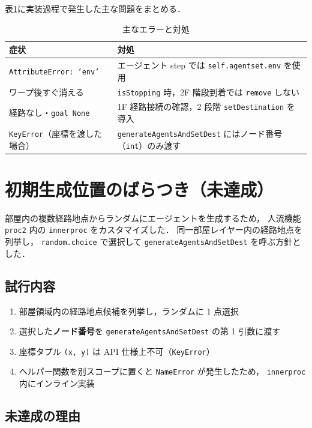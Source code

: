 \documentclass[11pt,a4paper]{ltjsarticle}
\begin{document}
表\ref{tab:errors}に実装過程で発生した主な問題をまとめる．

\begin{table}[H]
  \centering
  \caption{主なエラーと対処}
  \label{tab:errors}
  \small
  \begin{tabular}{p{4.2cm}p{8.5cm}}
    \toprule
    症状 & 対処 \\
    \midrule
    \texttt{AttributeError: 'env'} &
      エージェント step では \texttt{self.agentset.env} を使用 \\
    ワープ後すぐ消える &
      \texttt{isStopping} 時，2F 階段到着では \texttt{remove} しない \\
    経路なし・\texttt{goal None} &
      1F 経路接続の確認，2 段階 \texttt{setDestination} を導入 \\
    \texttt{KeyError}（座標を渡した場合） &
      \texttt{generateAgentsAndSetDest} にはノード番号（\texttt{int}）のみ渡す \\
    \bottomrule
  \end{tabular}
\end{table}

\section{初期生成位置のばらつき（未達成）}

部屋内の複数経路地点からランダムにエージェントを生成するため，
人流機能 \texttt{proc2} 内の \texttt{innerproc} をカスタマイズした．
同一部屋レイヤー内の経路地点を列挙し，
\texttt{random.choice} で選択して \texttt{generateAgentsAndSetDest} を呼ぶ方針とした．

\subsection{試行内容}

\begin{enumerate}[label=\arabic*.]
  \item 部屋領域内の経路地点候補を列挙し，ランダムに 1 点選択
  \item 選択した\textbf{ノード番号}を \texttt{generateAgentsAndSetDest} の第 1 引数に渡す
  \item 座標タプル \texttt{(x, y)} は API 仕様上不可（\texttt{KeyError}）
  \item ヘルパー関数を別スコープに置くと \texttt{NameError} が発生したため，
        \texttt{innerproc} 内にインライン実装
\end{enumerate}

\subsection{未達成の理由}
\end{document}
